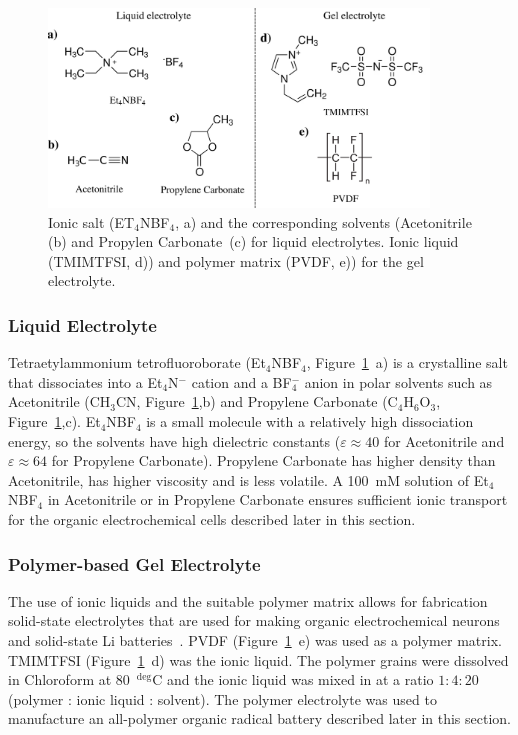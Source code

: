 \begin{figure}[h]
\center
	\includegraphics[width=0.9\textwidth]{./electrochemistry/figures/materials/electrolytes.pdf}
	\caption{Ionic salt (ET$_4$NBF$_4$, a) and the corresponding solvents (Acetonitrile (b) and Propylen Carbonate~(c) for liquid electrolytes. Ionic liquid (TMIMTFSI, d)) and polymer matrix (PVDF, e)) for the gel electrolyte.}
	\label{fig:electrolytes}
\end{figure}

\subsubsection{Liquid Electrolyte}
Tetraetylammonium tetrofluoroborate (Et$_4$NBF$_4$, Figure~\ref{fig:electrolytes}~a) is a crystalline salt that dissociates into a Et$_4$N$^-$ cation and a BF$_4^-$ anion in polar solvents such as Acetonitrile (CH$_3$CN, Figure~\ref{fig:electrolytes},b) and Propylene Carbonate (C$_4$H$_6$O$_3$, Figure~\ref{fig:electrolytes},c). Et$_4$NBF$_4$ is a small molecule with a relatively high dissociation energy, so the solvents have high dielectric constants ($\varepsilon\approx40$ for Acetonitrile and $\varepsilon\approx64$ for Propylene Carbonate). Propylene Carbonate has higher density than Acetonitrile, has higher viscosity and is less volatile. A 100~mM solution of Et$_4$NBF$_4$ in Acetonitrile or in Propylene Carbonate ensures sufficient ionic transport for the organic electrochemical cells described later in this section.

\subsubsection{Polymer-based Gel Electrolyte}
The use of ionic liquids and the suitable polymer matrix allows for fabrication solid-state electrolytes that are used for making organic electrochemical neurons~\cite{Harikesh2022} and solid-state Li batteries~\cite{Pang2021}. PVDF (Figure~\ref{fig:electrolytes}~e) was used as a polymer matrix. TMIMTFSI (Figure~\ref{fig:electrolytes}~d) was the ionic liquid. The polymer grains were dissolved in Chloroform at 80~$^{\deg}$C and the ionic liquid was mixed in at a ratio $1:4:20$ (polymer : ionic liquid : solvent). The polymer electrolyte was used to manufacture an all-polymer organic radical battery described later in this section.




